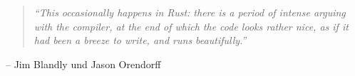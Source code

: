
\thispagestyle{empty}

\vspace*{\fill}

%
%


\begin{center}
	\begin{minipage}{.75\textwidth}
		\begin{quotation}
			\textit{\enquote{This occasionally happens in Rust: there is a period of intense arguing with the compiler, at the end of which the code looks rather nice, as if it had been a breeze to write, and runs beautifully.}}
		\end{quotation}
		\hfill \small{-- \textsf{Jim Blandly und Jason Orendorff \cite[262]{rust:orly_programming}}}
	\end{minipage}
\end{center}

\vspace*{\fill}